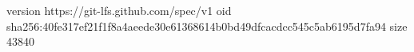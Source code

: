 version https://git-lfs.github.com/spec/v1
oid sha256:40fe317ef21f1f8a4aeede30e61368614b0bd49dfcacdcc545c5ab6195d7fa94
size 43840
